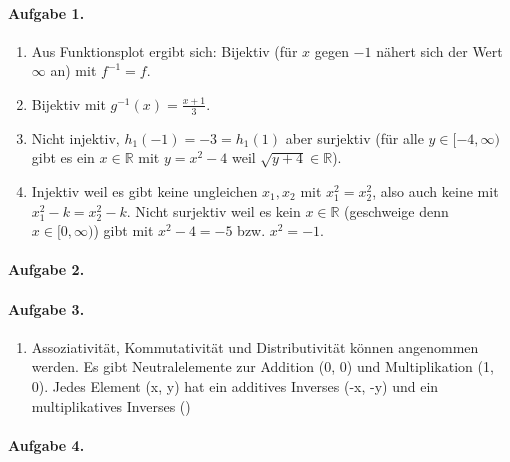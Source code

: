 \documentclass{article}
\begin{document}
\paragraph{Aufgabe 1.}
\begin{enumerate}
    \item Aus Funktionsplot ergibt sich: Bijektiv (für $x$ gegen $-1$ nähert sich der Wert $\infty$ an) mit $f^{-1} = f$.
    \item Bijektiv mit $g^{-1}(x) = \frac{x + 1}{3}$.
    \item Nicht injektiv, $h_1(-1) = -3 = h_1(1)$ aber surjektiv (für alle $y \in [-4,\infty)$ gibt es ein $x \in \mathbb{R}$ mit $y = x^2 - 4$ weil $\sqrt{y + 4} \in \mathbb{R}$).
    \item Injektiv weil es gibt keine ungleichen $x_1, x_2$ mit $x_1^2 = x_2^2$, also auch keine mit $x_1^2 - k = x_2^2 -k$. Nicht surjektiv weil es kein $x \in \mathbb{R}$ (geschweige denn $x \in [0, \infty)$) gibt mit $x^2 - 4 = -5$ bzw. $x^2 = -1$. 
\end{enumerate}

\paragraph{Aufgabe 2.}

\paragraph{Aufgabe 3.}

\begin{enumerate}
    \item Assoziativität, Kommutativität und Distributivität können angenommen werden. Es gibt Neutralelemente zur Addition (0, 0) und Multiplikation (1, 0). Jedes Element (x, y) hat ein additives Inverses (-x, -y) und ein multiplikatives Inverses ()
\end{enumerate}

\paragraph{Aufgabe 4.} 
\end{document}
